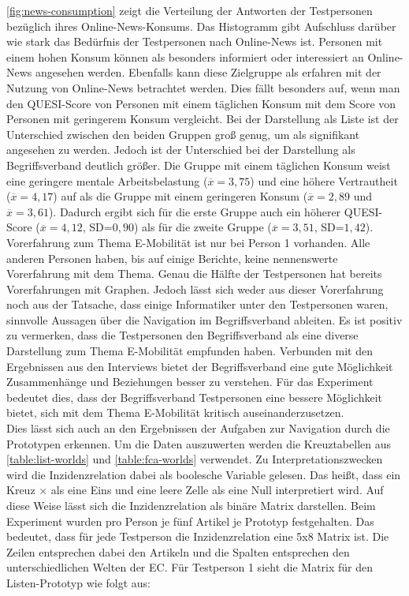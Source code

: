 \autoref{fig:news-consumption} zeigt die Verteilung der Antworten der Testpersonen bezüglich ihres Online-News-Konsums.
Das Histogramm gibt Aufschluss darüber wie stark das Bedürfnis der Testpersonen nach Online-News ist.
Personen mit einem hohen Konsum können als besonders informiert oder interessiert an Online-News angesehen werden.
Ebenfalls kann diese Zielgruppe als erfahren mit der Nutzung von Online-News betrachtet werden.
Dies fällt besonders auf, wenn man den \ac{QUESI}-Score von Personen mit einem täglichen Konsum mit dem Score von Personen mit geringerem Konsum vergleicht.
Bei der Darstellung als Liste ist der Unterschied zwischen den beiden Gruppen groß genug, um als signifikant angesehen zu werden.
Jedoch ist der Unterschied bei der Darstellung als Begriffsverband deutlich größer.
Die Gruppe mit einem täglichen Konsum weist eine geringere mentale Arbeitsbelastung ($\overline{x} = 3,75$) und eine höhere Vertrautheit ($\overline{x} = 4,17$) auf als die Gruppe mit einem geringeren Konsum ($\overline{x} = 2,89$ und $\overline{x} = 3,61$).
Dadurch ergibt sich für die erste Gruppe auch ein höherer \ac{QUESI}-Score ($\overline{x} = 4,12$, SD=$0,90$) als für die zweite Gruppe ($\overline{x} = 3,51$, SD=$1,42$). \\

Vorerfahrung zum Thema E-Mobilität ist nur bei Person 1 vorhanden.
Alle anderen Personen haben, bis auf einige Berichte, keine nennenswerte Vorerfahrung mit dem Thema.
Genau die Hälfte der Testpersonen hat bereits Vorerfahrungen mit Graphen.
Jedoch lässt sich weder aus dieser Vorerfahrung noch aus der Tatsache, dass einige Informatiker unter den Testpersonen waren, sinnvolle Aussagen über die Navigation im Begriffsverband ableiten.
Es ist positiv zu vermerken, dass die Testpersonen den Begriffsverband als eine diverse Darstellung zum Thema E-Mobilität empfunden haben.
Verbunden mit den Ergebnissen aus den Interviews bietet der Begriffsverband eine gute Möglichkeit Zusammenhänge und Beziehungen besser zu verstehen.
Für das Experiment bedeutet dies, dass der Begriffsverband Testpersonen eine bessere Möglichkeit bietet, sich mit dem Thema E-Mobilität kritisch auseinanderzusetzen. \\

Dies lässt sich auch an den Ergebnissen der Aufgaben zur Navigation durch die Prototypen erkennen.
Um die Daten auszuwerten werden die Kreuztabellen aus \autoref{table:list-worlds} und \autoref{table:fca-worlds} verwendet.
Zu Interpretationszwecken wird die Inzidenzrelation dabei als boolesche Variable gelesen.
Das heißt, dass ein Kreuz $\times$ als eine Eins und eine leere Zelle als eine Null interpretiert wird.
Auf diese Weise lässt sich die Inzidenzrelation als binäre Matrix darstellen.
Beim Experiment wurden pro Person je fünf Artikel je Prototyp festgehalten.
Das bedeutet, dass für jede Testperson die Inzidenzrelation eine 5x8 Matrix ist.
Die Zeilen entsprechen dabei den Artikeln und die Spalten entsprechen den unterschiedlichen Welten der \ac{EC}.
Für Testperson 1 sieht die Matrix für den Listen-Prototyp wie folgt aus:

